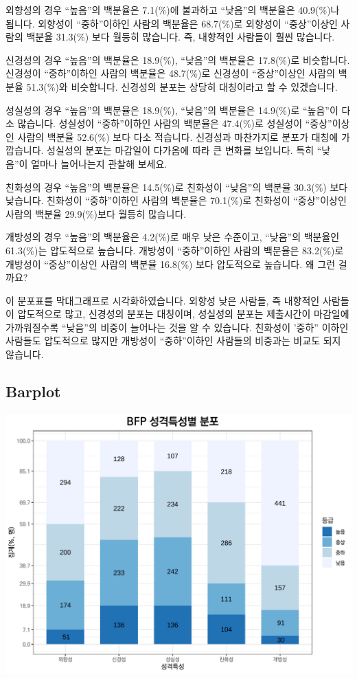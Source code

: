 \documentclass[
]{book}
\begin{document}
외향성의 경우 ``높음''의 백분율은 7.1(\%)에 불과하고 ``낮음''의 백분율은 40.9(\%)나 됩니다. 외향성이 ``중하''이하인 사람의 백분율은 68.7(\%)로 외향성이 ``중상''이상인 사람의 백분율 31.3(\%) 보다 월등히 많습니다. 즉, 내향적인 사람들이 훨씬 많습니다.

신경성의 경우 ``높음''의 백분율은 18.9(\%), ``낮음''의 백분율은 17.8(\%)로 비슷합니다. 신경성이 ``중하''이하인 사람의 백분율은 48.7(\%)로 신경성이 ``중상''이상인 사람의 백분율 51.3(\%)와 비슷합니다. 신경성의 분포는 상당히 대칭이라고 할 수 있겠습니다.

성실성의 경우 ``높음''의 백분율은 18.9(\%), ``낮음''의 백분율은 14.9(\%)로 ``높음''이 다소 많습니다. 성실성이 ``중하''이하인 사람의 백분율은 47.4(\%)로 성실성이 ``중상''이상인 사람의 백분율 52.6(\%) 보다 다소 적습니다. 신경성과 마찬가지로 분포가 대칭에 가깝습니다. 성실성의 분포는 마감일이 다가옴에 따라 큰 변화를 보입니다. 특히 ``낮음''이 얼마나 늘어나는지 관찰해 보세요.

친화성의 경우 ``높음''의 백분율은 14.5(\%)로 친화성이 ``낮음''의 백분율 30.3(\%) 보다 낮습니다. 친화성이 ``중하''이하인 사람의 백분율은 70.1(\%)로 친화성이 ``중상''이상인 사람의 백분율 29.9(\%)보다 월등히 많습니다.

개방성의 경우 ``높음''의 백분율은 4.2(\%)로 매우 낮은 수준이고, ``낮음''의 백분율인 61.3(\%)는 압도적으로 높습니다. 개방성이 ``중하''이하인 사람의 백분율은 83.2(\%)로 개방성이 ``중상''이상인 사람의 백분율 16.8(\%) 보다 압도적으로 높습니다. 왜 그런 걸까요?

이 분포표를 막대그래프로 시각화하였습니다. 외향성 낮은 사람들, 즉 내향적인 사람들이 압도적으로 많고, 신경성의 분포는 대칭이며, 성실성의 분포는 제출시간이 마감일에 가까워질수록 ``낮음''의 비중이 늘어나는 것을 알 수 있습니다. 친화성이 '중하'' 이하인 사람들도 압도적으로 많지만 개방성이 ``중하''이하인 사람들의 비중과는 비교도 되지 않습니다.

\subsection{Barplot}\label{barplot-1}

\includegraphics{Quiz_report_2025_files/figure-latex/unnamed-chunk-358-1.pdf}
\end{document}
